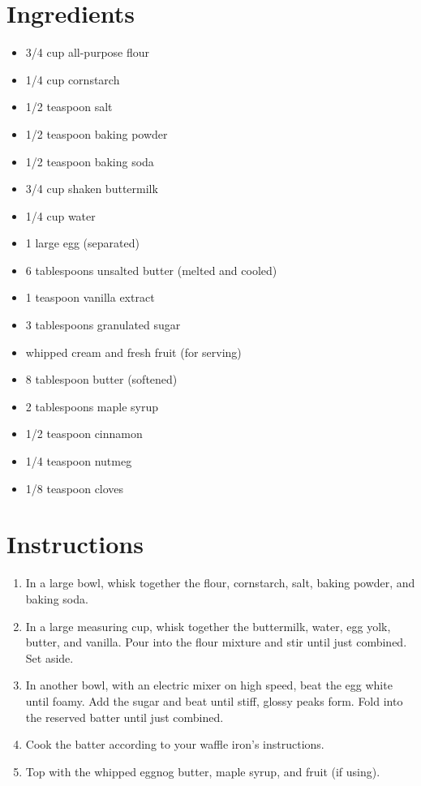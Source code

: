 \documentclass[
  letterpaper,
  DIV=11,
  numbers=noendperiod,
  titlepage=false]{scrreprt}
\providecommand{\tightlist}{%
  \setlength{\itemsep}{0pt}\setlength{\parskip}{0pt}}\usepackage{longtable,booktabs,array}
\begin{document}
\section{Ingredients}\label{ingredients-168}

\begin{itemize}
\tightlist
\item
  3/4 cup all-purpose flour
\item
  1/4 cup cornstarch
\item
  1/2 teaspoon salt
\item
  1/2 teaspoon baking powder
\item
  1/2 teaspoon baking soda
\item
  3/4 cup shaken buttermilk
\item
  1/4 cup water
\item
  1 large egg (separated)
\item
  6 tablespoons unsalted butter (melted and cooled)
\item
  1 teaspoon vanilla extract
\item
  3 tablespoons granulated sugar
\item
  whipped cream and fresh fruit (for serving)
\item
  8 tablespoon butter (softened)
\item
  2 tablespoons maple syrup
\item
  1/2 teaspoon cinnamon
\item
  1/4 teaspoon nutmeg
\item
  1/8 teaspoon cloves
\end{itemize}

\section{Instructions}\label{instructions-168}

\begin{enumerate}
\def\labelenumi{\arabic{enumi}.}
\tightlist
\item
  In a large bowl, whisk together the flour, cornstarch, salt, baking
  powder, and baking soda.
\item
  In a large measuring cup, whisk together the buttermilk, water, egg
  yolk, butter, and vanilla. Pour into the flour mixture and stir until
  just combined. Set aside.
\item
  In another bowl, with an electric mixer on high speed, beat the egg
  white until foamy. Add the sugar and beat until stiff, glossy peaks
  form. Fold into the reserved batter until just combined.
\item
  Cook the batter according to your waffle iron's instructions.
\item
  Top with the whipped eggnog butter, maple syrup, and fruit (if using).
\end{enumerate}
\end{document}
